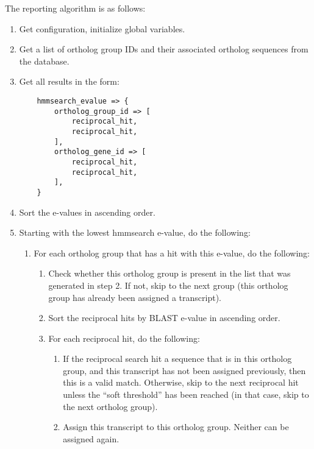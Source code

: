 The reporting algorithm is as follows:

\begin{enumerate}
	\item Get configuration, initialize global variables.
	\item Get a list of ortholog group IDs and their associated ortholog sequences
		from the database.
	\item Get all results in the form:
	\begin{lstlisting}
	hmmsearch_evalue => {
		ortholog_group_id => [
			reciprocal_hit,
			reciprocal_hit,
		],
		ortholog_gene_id => [
			reciprocal_hit,
			reciprocal_hit,
		],
	}
	\end{lstlisting}
	\item Sort the e-values in ascending order.
	\item Starting with the lowest hmmsearch e-value, do the following:
	\begin{enumerate}
		\item For each ortholog group that has a hit with this e-value, do the following:
		\begin{enumerate}
			\item Check whether this ortholog group is present in the list that was
				generated in step 2. If not, skip to the next group (this ortholog group
				has already been assigned a transcript).
			\item Sort the reciprocal hits by BLAST e-value in ascending order.
			\item For each reciprocal hit, do the following:
			\begin{enumerate}
				\item If the reciprocal search hit a sequence that is in this ortholog
					group, and this transcript has not been assigned previously, then this
					is a valid match. Otherwise, skip to the next reciprocal hit unless
					the ``soft threshold'' has been reached (in that case, skip to the
					next ortholog group).
				\item Assign this transcript to this ortholog group. Neither can be
					assigned again.
			\end{enumerate}
		\end{enumerate}
	\end{enumerate}
\end{enumerate}

